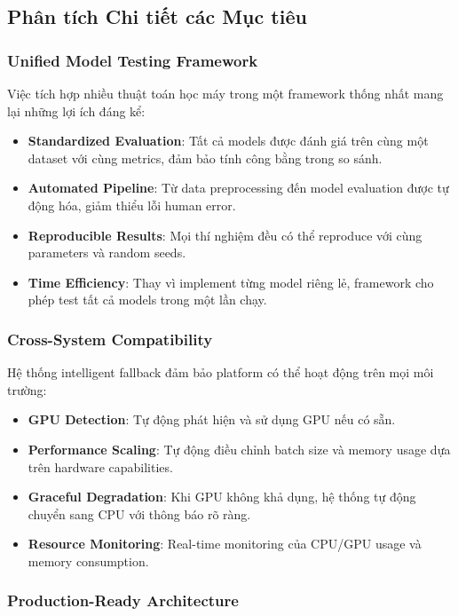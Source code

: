 \subsection{Phân tích Chi tiết các Mục tiêu}

\subsubsection{Unified Model Testing Framework}

Việc tích hợp nhiều thuật toán học máy trong một framework thống nhất mang lại những lợi ích đáng kể:

\begin{itemize}
    \item \textbf{Standardized Evaluation}: Tất cả models được đánh giá trên cùng một dataset với cùng metrics, đảm bảo tính công bằng trong so sánh.
    \item \textbf{Automated Pipeline}: Từ data preprocessing đến model evaluation được tự động hóa, giảm thiểu lỗi human error.
    \item \textbf{Reproducible Results}: Mọi thí nghiệm đều có thể reproduce với cùng parameters và random seeds.
    \item \textbf{Time Efficiency}: Thay vì implement từng model riêng lẻ, framework cho phép test tất cả models trong một lần chạy.
\end{itemize}

\subsubsection{Cross-System Compatibility}

Hệ thống intelligent fallback đảm bảo platform có thể hoạt động trên mọi môi trường:

\begin{itemize}
    \item \textbf{GPU Detection}: Tự động phát hiện và sử dụng GPU nếu có sẵn.
    \item \textbf{Performance Scaling}: Tự động điều chỉnh batch size và memory usage dựa trên hardware capabilities.
    \item \textbf{Graceful Degradation}: Khi GPU không khả dụng, hệ thống tự động chuyển sang CPU với thông báo rõ ràng.
    \item \textbf{Resource Monitoring}: Real-time monitoring của CPU/GPU usage và memory consumption.
\end{itemize}

\subsubsection{Production-Ready Architecture}

